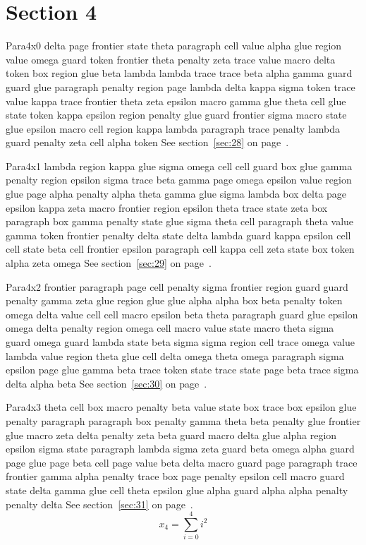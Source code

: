 \documentclass{article}
\begin{document}
\section{Section 4}\label{sec:4}
Para4x0 delta page frontier state theta paragraph cell value alpha glue region value omega guard token frontier theta penalty zeta trace value macro delta token box region glue beta lambda lambda trace trace beta alpha gamma guard guard glue paragraph penalty region page lambda delta kappa sigma token trace value kappa trace frontier theta zeta epsilon macro gamma glue theta cell glue state token kappa epsilon region penalty glue guard frontier sigma macro state glue epsilon macro cell region kappa lambda paragraph trace penalty lambda guard penalty zeta cell alpha token See section~\ref{sec:28} on page~\pageref{sec:12}.

Para4x1 lambda region kappa glue sigma omega cell cell guard box glue gamma penalty region epsilon sigma trace beta gamma page omega epsilon value region glue page alpha penalty alpha theta gamma glue sigma lambda box delta page epsilon kappa zeta macro frontier region epsilon theta trace state zeta box paragraph box gamma penalty state glue sigma theta cell paragraph theta value gamma token frontier penalty delta state delta lambda guard kappa epsilon cell cell state beta cell frontier epsilon paragraph cell kappa cell zeta state box token alpha zeta omega See section~\ref{sec:29} on page~\pageref{sec:13}.

Para4x2 frontier paragraph page cell penalty sigma frontier region guard guard penalty gamma zeta glue region glue glue alpha alpha box beta penalty token omega delta value cell cell macro epsilon beta theta paragraph guard glue epsilon omega delta penalty region omega cell macro value state macro theta sigma guard omega guard lambda state beta sigma sigma region cell trace omega value lambda value region theta glue cell delta omega theta omega paragraph sigma epsilon page glue gamma beta trace token state trace state page beta trace sigma delta alpha beta See section~\ref{sec:30} on page~\pageref{sec:14}.

Para4x3 theta cell box macro penalty beta value state box trace box epsilon glue penalty paragraph paragraph box penalty gamma theta beta penalty glue frontier glue macro zeta delta penalty zeta beta guard macro delta glue alpha region epsilon sigma state paragraph lambda sigma zeta guard beta omega alpha guard page glue page beta cell page value beta delta macro guard page paragraph trace frontier gamma alpha penalty trace box page penalty epsilon cell macro guard state delta gamma glue cell theta epsilon glue alpha guard alpha alpha penalty penalty delta See section~\ref{sec:31} on page~\pageref{sec:15}.
\begin{equation} x_{4} = \sum_{i=0}^{4} i^2 \label{eq:4}\end{equation}
\end{document}
